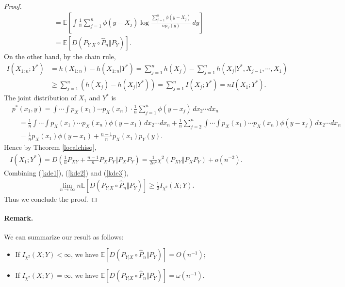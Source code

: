 \documentclass{article}
\numberwithin{equation}{section}
\newcommand{\E}{\mathbb{E}}
\newcommand{\wh}{\widehat}
\theoremstyle{plain}
\theoremstyle{definition}
\begin{document}
\begin{proof}
\begin{equation}
\begin{aligned}
	&=\E\left[\int\frac{1}{n}\sum_{j=1}^n\phi(y-X_j)\log\frac{\sum_{j=1}^n\phi(y-X_j)}{np_Y(y)}\,dy\right]\\
	&=\E\left[D(P_{Y|X}\circ\wh{P}_n\Vert P_Y)\right].
\end{aligned}\label{kde1}
\end{equation}
On the other hand, by the chain rule,
\begin{equation}
	\begin{aligned}
	I(X_{1:n};Y^*)&=h(X_{1:n})-h(X_{1:n}|Y^*)=\sum_{j=1}^n h(X_j)-\sum_{j=1}^n h(X_j|Y^*,X_{j-1},\cdots,X_1)\\
	&\geq\sum_{j=1}^n\left(h(X_j)-h(X_j|Y^*)\right)=\sum_{j=1}^n I(X_j;Y^*)=nI(X_1;Y^*).
\end{aligned}\label{kde2}
\end{equation}
The joint distribution of $X_1$ and $Y^*$ is
\begin{align*}
	&p^*(x_1,y)=\int\cdots\int p_X(x_1)\cdots p_X(x_n)\cdot \frac{1}{n}\sum_{j=1}^n\phi(y-x_j)\,dx_2\cdots dx_n\\
	&\quad=\frac{1}{n}\int\cdots\int p_X(x_1)\cdots p_X(x_n)\phi(y-x_1)\,dx_2\cdots dx_n+\frac{1}{n}\sum_{j=2}^n\int\cdots\int p_X(x_1)\cdots p_X(x_n) \phi(y-x_j)\,dx_2\cdots dx_n\\
	&\quad=\frac{1}{n}p_X(x_1)\phi(y-x_1)+\frac{n-1}{n}p_X(x_1)p_Y(y).
\end{align*}
Hence by Theorem \ref{localchisq},
\begin{align}
	I(X_1;Y^*)=D\left(\frac{1}{n}P_{XY}+\frac{n-1}{n}P_XP_Y\bigg\Vert P_XP_Y\right)=\frac{1}{2n^2}\chi^2(P_{XY}\Vert P_XP_Y)+o(n^{-2}).\label{kde3}
\end{align}
Combining (\ref{kde1}), (\ref{kde2}) and (\ref{kde3}),
\begin{align*}
	\lim_{n\to\infty} n\E\left[D(P_{Y|X}\circ\wh{P}_n\Vert P_Y)\right]\geq\frac{1}{2}I_{\chi^2}(X;Y).
\end{align*}
Thus we conclude the proof.
\end{proof}
\paragraph{Remark.} We can summarize our result as follows:\vspace{0.2cm}
\begin{itemize}
	\item If $I_{\chi^2}(X;Y)<\infty$, we have $\E\left[D(P_{Y|X}\circ\wh{P}_n\Vert P_Y)\right]=O(n^{-1})$;\vspace{0.2cm}
	\item If $I_{\chi^2}(X;Y)=\infty$, we have $\E\left[D(P_{Y|X}\circ\wh{P}_n\Vert P_Y)\right]=\omega(n^{-1})$. 
\end{itemize}
\end{document}
